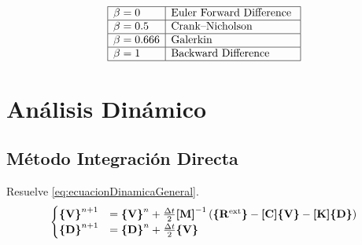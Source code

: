 \[
\begin{array}{|l|l|}\hline \beta=0 & {\text {Euler Forward Difference }} \\ \hline \beta=0.5 & {\text {Crank--Nicholson }} \\ \hline \beta=0.666 & {\text {Galerkin }} \\ \hline \beta=1 & {\text {Backward Difference }} \\ \hline\end{array}
\]

\section{Análisis Dinámico}

\subsection*{Método Integración Directa}
Resuelve \ref{eq:ecuacionDinamicaGeneral}.
\begin{align*}
	\begin{cases}
	\Cme{V}^{n+1}&=\Cme{V}^n + \frac{\Delta t}{2}  \Mme{M}^{-1}\left(\Cme{R^{\mathrm{ext}}} - \MC \Cme{V} - \MK \Cme{D} \right) \\
	\Cme{D}^{n+1}&=\Cme{D}^n + \frac{\Delta t}{2} \Cme{V}
	\end{cases}
\end{align*}


